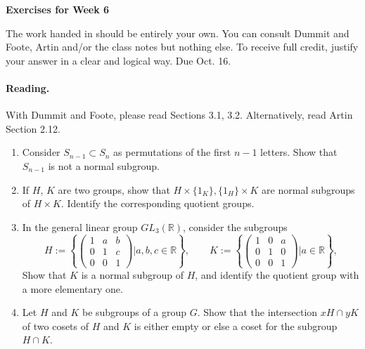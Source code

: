 \documentclass[12pt]{article}
\title{}
\date{}
\theoremstyle{plain}
\theoremstyle{definition}
\theoremstyle{remark}
\begin{document}
\begin{center}
{\Large \bf Exercises for Week 6}
\end{center}
The work handed in should be entirely your own. You can consult Dummit and Foote, Artin and/or the class notes but nothing else. To receive full credit, justify your answer in a clear and logical way. Due Oct. 16.

\paragraph{Reading.} With Dummit and Foote, please read Sections 3.1, 3.2.  Alternatively, read Artin Section 2.12.

\begin{enumerate}
\item Consider $S_{n-1}\subset S_n$ as permutations of the first $n-1$ letters. Show that $S_{n-1}$ is not a normal subgroup.
\item If $H$, $K$ are two groups, show that $H\times \{1_K\}, \{1_H\}\times K $ are normal subgroups of $ H \times K$. Identify the corresponding quotient groups.
\item In the general linear group $GL_3(\mathbb{R})$, consider the subgroups
$$H:=
\left\{
\left(
\begin{array}{ccc}
1 & a & b\\
0 & 1 & c\\
0 & 0 & 1
\end{array}
\right)
\Big|
a, b, c \in \mathbb{R}
\right\}, \quad \quad
K:=
\left\{
\left(
\begin{array}{ccc}
1 & 0 & a\\
0 & 1 & 0\\
0 & 0 & 1
\end{array}
\right)
\Big|
a \in \mathbb{R}
\right\},
$$
Show that $K$ is a normal subgroup of $H$, and identify the quotient group with a more elementary one.
\item Let $H$ and $K$ be subgroups of a group $G$. Show that the intersection $xH\cap yK$ of two cosets of $H$ and $K$ is either empty or else a coset for the subgroup $H\cap K$.
\end{enumerate}
\end{document}
